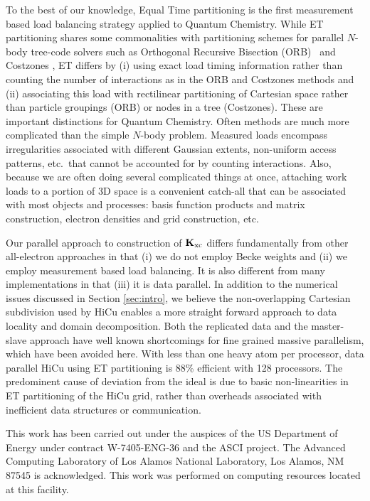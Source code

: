\commentoutA{\documentclass[prl,aps,twocolumn,showpacs,twocolumngrid,superbib]{revtex4}}
\newcommand{\Kxc}{{\bf K}_{\mathrm{xc}}}
\begin{document}
To the best of our knowledge, Equal Time partitioning is the first
measurement based load balancing strategy applied to Quantum
Chemistry.  While ET partitioning shares some commonalities with
partitioning schemes for parallel $N$-body tree-code solvers such as
Orthogonal Recursive Bisection (ORB)~\cite{warren:92_article} and
Costzones \cite{Singh93}, ET differs by (i) using exact load timing
information rather than counting the number of interactions as in the
ORB and Costzones methods and (ii) associating this load with
rectilinear partitioning of Cartesian space rather than particle
groupings (ORB) or nodes in a tree (Costzones).  These are important
distinctions for Quantum Chemistry.  Often methods are much more
complicated than the simple $N$-body problem.  Measured loads
encompass irregularities associated with different Gaussian extents,
non-uniform access patterns, etc.~that cannot be accounted for by
counting interactions.  Also, because we are often doing several
complicated things at once, attaching work loads to a portion of
3D space is a convenient catch-all that can be associated with most
objects and processes: basis function products and matrix construction,
electron densities and grid construction, etc.  

Our parallel approach to construction of $\Kxc$ differs fundamentally
from other all-electron approaches in that (i) we do not employ Becke
weights and (ii) we employ measurement based load balancing.  It is
also different from many implementations in that (iii) it is data
parallel.  In addition to the numerical issues discussed in Section
\ref{sec:intro}, we believe the non-overlapping Cartesian subdivision
used by HiCu enables a more straight forward approach to data locality
and domain decomposition.  Both the replicated data and the
master-slave approach have well known shortcomings for fine grained
massive parallelism, which have been avoided here.  With less than one
heavy atom per processor, data parallel HiCu using ET partitioning is
88\% efficient with 128 processors.  The predominent cause of
deviation from the ideal is due to basic non-linearities in ET
partitioning of the HiCu grid, rather than overheads associated with
inefficient data structures or communication.

\begin{acknowledgments}
This work has been carried out under the auspices of the US Department
of Energy under contract W-7405-ENG-36 and the ASCI project.  The
Advanced Computing Laboratory of Los Alamos National Laboratory, Los
Alamos, NM 87545 is acknowledged.  This work was performed on
computing resources located at this facility.
\end{acknowledgments}
\end{document}
